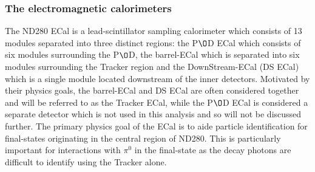 \subsubsection{The electromagnetic calorimeters}
\label{subsubsec:ecal}
The ND280 ECal is a lead-scintillator sampling calorimeter which consists of 13 modules separated into three distinct regions: the P$\O$D ECal which consists of six modules surrounding the P$\O$D, the barrel-ECal which is separated into six modules surrounding the Tracker region and the DownStream-ECal (DS ECal) which is a single module located downstream of the inner detectors.  Motivated by their physics goals, the barrel-ECal and DS ECal are often considered together and will be referred to as the Tracker ECal, while the P$\O$D ECal is considered a separate detector which is not used in this analysis and so will not be discussed further.  The primary physics goal of the ECal is to aide particle identification for final-states originating in the central region of ND280.  This is particularly important for interactions with $\pi^0$ in the final-state as the decay photons are difficult to identify using the Tracker alone.
\newline
\newline

